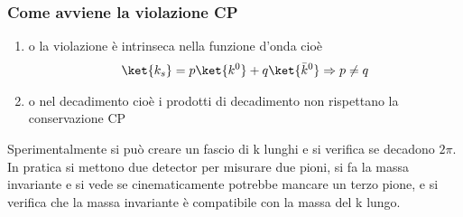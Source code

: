 \documentclass[12pt]{book}
\begin{document}
\subsubsection{Come avviene la violazione CP}
\begin{enumerate}
	\item o la violazione è intrinseca nella funzione d'onda cioè
	\begin{gather}
		\ket{k_s} = p \ket{k^0} + q \ket{\bar k^0} \Rightarrow p \neq q
	\end{gather}
	\item o nel decadimento cioè i prodotti di decadimento non rispettano la conservazione CP
\end{enumerate}
Sperimentalmente si può creare un fascio di k lunghi e si verifica se decadono $2 \pi$. In pratica si mettono due detector per misurare due pioni, si fa la massa invariante e si vede se cinematicamente potrebbe mancare un terzo pione, e si verifica che la massa invariante è compatibile con la massa del k lungo. 








 
 
\end{document}
